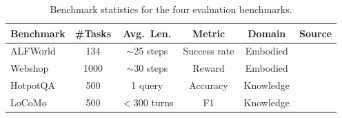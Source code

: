 \begin{table}[h]
\centering
\small
\caption{Benchmark statistics for the four evaluation
  benchmarks.}
\label{tab:dataset_stats}
\begin{tabular}{l|ccccc}
\toprule
\textbf{Benchmark} & \textbf{\#Tasks}
  & \textbf{Avg.\ Len.} & \textbf{Metric}
  & \textbf{Domain} & \textbf{Source} \\
\midrule
ALFWorld  & 134 & $\sim$25 steps & Success rate
  & Embodied  & \cite{shridhar2020alfworld} \\
Webshop  & 1000 & $\sim$30 steps & Reward
  & Embodied  & \cite{yao2022webshop} \\
HotpotQA  & 500 & 1 query  & Accuracy
  & Knowledge & \cite{yang2018hotpotqa} \\
LoCoMo     & 500 & $<$300 turns  & F1
  & Knowledge & \cite{maharana2024evaluating} \\
\bottomrule
\end{tabular}
\end{table}